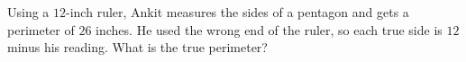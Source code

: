 Using a $12$-inch ruler, Ankit measures the sides of a pentagon and gets a perimeter of $26$ inches. He used the wrong end of the ruler, so each true side is $12$ minus his reading. What is the true perimeter?
